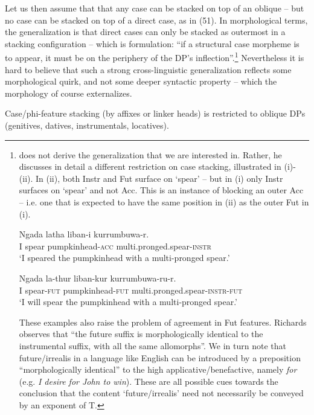 \documentclass[output=paper]{langsci/langscibook}
\begin{document}
Let us then assume that that any case can be stacked on top of an oblique – but no case can be stacked on top of a direct case, as in (51). In morphological terms, the generalization is that direct cases can only be stacked as outermost in a stacking configuration – which is  formulation: “if a structural case morpheme is to appear, it must be on the periphery of the DP’s inflection”.\footnote{\citet{Richards2013} does not derive the generalization that we are interested in. Rather, he discusses in detail a different restriction on case stacking, illustrated in (i)-(ii). In (ii), both Instr and Fut surface on ‘spear’ – but in (i) only Instr surfaces on ‘spear’ and not Acc. This is an instance of blocking an outer Acc – i.e. one that is expected to have the same position in (ii) as the outer Fut in (i).

\ea \gll    Ngada latha   liban-i       kurrumbuwa-r.\\
            I   spear   pumpkinhead-\textsc{acc}   multi.pronged.spear-\textsc{instr}\\
    \glt    ‘I speared the pumpkinhead with a multi-pronged spear.’\\
\z

\ea \gll    Ngada     la-thur     liban-kur     kurrumbuwa-ru-r.\\
            I     spear-\textsc{fut}   pumpkinhead-\textsc{fut}   multi.pronged.spear-\textsc{instr-fut}\\
    \glt    ‘I will spear the pumpkinhead with a multi-pronged spear.’\\
\z

These examples also raise the problem of agreement in Fut features. Richards observes that “the future suffix is morphologically identical to the instrumental suffix, with all the same allomorphs”. We in turn note that future\slash irrealis in a language like English can be introduced by a preposition “morphologically identical” to the high applicative\slash benefactive, namely \textit{for} (e.g. \textit{I desire for John to win}). These are all possible cues towards the conclusion that the content ‘future\slash irrealis’ need not necessarily be conveyed by an exponent of T.}  Nevertheless it is hard to believe that such a strong cross-linguistic generalization reflects some morphological quirk, and not some deeper syntactic property – which the morphology of course externalizes. 

\ea%
    \label{ex:manzini:51}
    Case/phi-feature stacking (by affixes or linker heads) is restricted to oblique DPs (genitives, datives, instrumentals, locatives).  
    \z         
\end{document}
